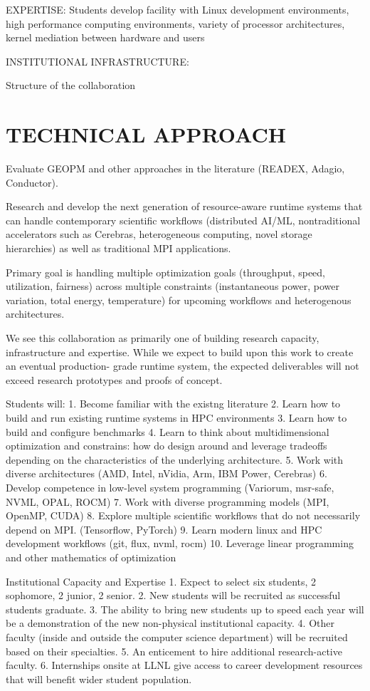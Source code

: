 \documentclass[11pt]{article}
\begin{document}
EXPERTISE:
Students develop facility with Linux development environments, high performance
computing environments, variety of processor architectures, kernel mediation between
hardware and users

INSTITUTIONAL INFRASTRUCTURE:

Structure of the collaboration

\section{TECHNICAL APPROACH}
Evaluate GEOPM and other approaches in the literature (READEX, Adagio, Conductor).

Research and develop the next generation of resource-aware runtime systems that
can handle contemporary scientific workflows (distributed AI/ML, nontraditional
accelerators such as Cerebras, heterogeneous computing, novel storage hierarchies) 
as well as traditional MPI applications.

Primary goal is handling multiple optimization goals (throughput, speed, utilization,
fairness) across multiple constraints (instantaneous power, power variation, total energy, 
temperature) for upcoming workflows and heterogenous architectures.

We see this collaboration as primarily one of building research capacity, infrastructure
and expertise.  While we expect to build upon this work to create an eventual production-
grade runtime system, the expected deliverables will not exceed research prototypes and
proofs of concept.  

Students will:
1. Become familiar with the existng literature
2. Learn how to build and run existing runtime systems in HPC environments
3. Learn how to build and configure benchmarks
4. Learn to think about multidimensional optimization and constrains:
how do design around and leverage tradeoffs depending on the characteristics of the
underlying architecture.
5. Work with diverse architectures (AMD, Intel, nVidia, Arm, IBM Power, Cerebras)
6. Develop competence in low-level system programming (Variorum, msr-safe, NVML, OPAL, ROCM)
7. Work with diverse programming models (MPI, OpenMP, CUDA)
8. Explore multiple scientific workflows that do not necessarily depend on MPI. (Tensorflow, PyTorch)
9. Learn modern linux and HPC development workflows (git, flux, nvml, rocm)
10. Leverage linear programming and other mathematics of optimization

Institutional Capacity and Expertise
1. Expect to select six students, 2 sophomore, 2 junior, 2 senior.
2. New students will be recruited as successful students graduate.
3. The ability to bring new students up to speed each year will be a demonstration
of the new non-physical institutional capacity.
4. Other faculty (inside and outside the computer science department) 
will be recruited based on their specialties.
5. An enticement to hire additional research-active faculty.  
6. Internships onsite at LLNL give access to career development resources
that will benefit wider student population.
\end{document}
